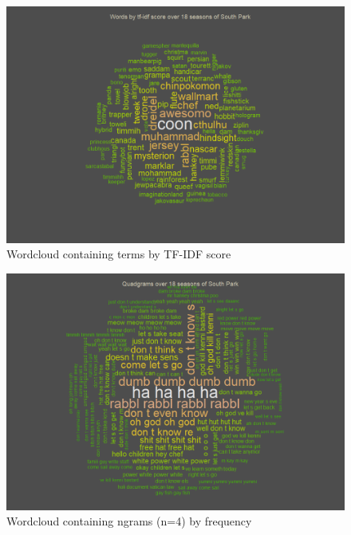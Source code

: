 \documentclass[10pt,a4paper]{article}
\begin{document}
	\begin{figure}[h]
	\centering
	\includegraphics[scale=0.9]{images/WordCloud-TFIDF.png}
	\caption{Wordcloud containing terms by TF-IDF score}
	\label{fig:WordCloud-TFIDF}
	\end{figure}
	\begin{figure}[h]
	\centering
	\includegraphics[scale=0.9]{images/WordCloud-ngram.png}
	\caption{Wordcloud containing ngrams (n=4) by frequency}
	\label{fig:WordCloud-ngram}
	\end{figure}
	
\end{document}
